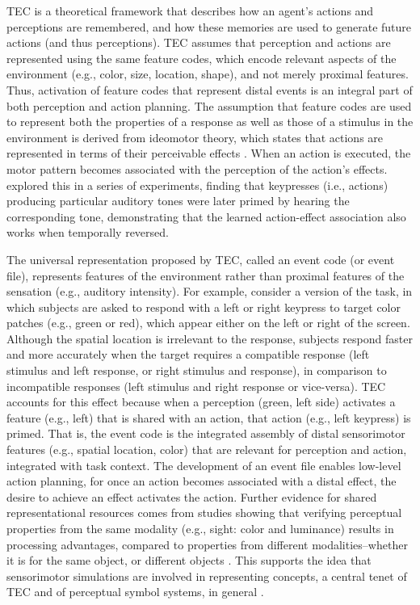 \documentclass[10pt,letterpaper]{article}
\numberwithin{equation}{section}
\begin{document}
TEC is a theoretical framework that describes how an agent's actions and perceptions are remembered, and how these memories are used to generate future actions (and thus perceptions). TEC assumes that perception and actions are represented using the same feature codes, which encode relevant aspects of the environment (e.g., color, size, location, shape), and not merely proximal features. Thus, activation of feature codes that represent distal events is an integral part of both perception and action planning. The assumption that feature codes are used to represent both the properties of a response as well as those of a stimulus in the environment is derived from ideomotor theory, which states that actions are represented in terms of their perceivable effects \cite{James:1890,Stock:2004}. When an action is executed, the motor pattern becomes associated with the perception of the action's effects.  explored this in a series of experiments, finding that keypresses (i.e., actions) producing particular auditory tones were later primed by hearing the corresponding tone, demonstrating that the learned action-effect association also works when temporally reversed.

The universal representation proposed by TEC, called an event code (or event file), represents features of the environment rather than proximal features of the sensation (e.g., auditory intensity). For example, consider a version of the  task, in which subjects are asked to respond with a left or right keypress to target color patches (e.g., green or red), which appear either on the left or right of the screen. Although the spatial location is irrelevant to the response, subjects respond faster and more accurately when the target requires a compatible response (left stimulus and left response, or right stimulus and response), in comparison to incompatible responses (left stimulus and right response or vice-versa). TEC accounts for this effect because when a perception (green, left side) activates a feature (e.g., left) that is shared with an action, that action (e.g., left keypress) is primed. That is, the event code is the integrated assembly of distal sensorimotor features (e.g., spatial location, color) that are relevant for perception and action, integrated with task context. The development of an event file enables low-level action planning, for once an action becomes associated with a distal effect, the desire to achieve an effect activates the action. Further evidence for shared representational resources comes from studies showing that verifying perceptual properties from the same modality (e.g., sight: color and luminance) results in processing advantages, compared to properties from different modalities--whether it is for the same object, or different objects \cite{Pecher:2003,Pecher:2004}. This supports the idea that sensorimotor simulations are involved in representing concepts, a central tenet of TEC and of perceptual symbol systems, in general \cite{Barsalou:1999}.
\end{document}
